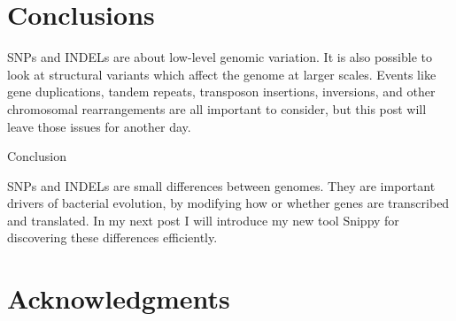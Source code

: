 \section{Conclusions}

SNPs and INDELs are about low-level genomic variation. It is also possible to look at structural variants which affect the genome at larger scales. Events like gene duplications, tandem repeats, transposon insertions, inversions, and other chromosomal rearrangements are all important to consider, but this post will leave those issues for another day.

Conclusion

SNPs and INDELs are small differences between genomes. They are important drivers of bacterial evolution, by modifying how or whether genes are transcribed and translated. In my next post I will introduce my new tool Snippy for discovering these differences efficiently.

\section{Acknowledgments}



